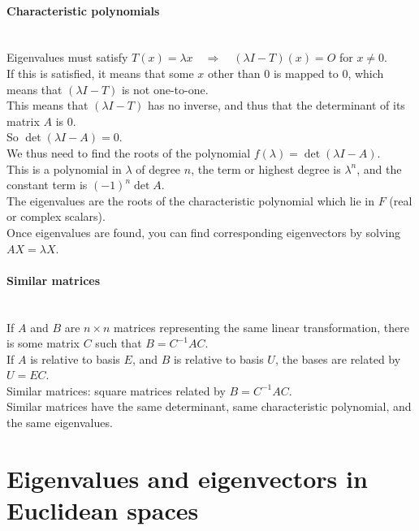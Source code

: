 \documentclass[10pt]{article}
\begin{document}
\paragraph{Characteristic polynomials}\ \\
Eigenvalues must satisfy $T(x) = \lambda x \quad \Longrightarrow \quad (\lambda I - T)(x) = O$ for $x \neq 0$.\\
If this is satisfied, it means that some $x$ other than $0$ is mapped to $0$, which means that $(\lambda I - T)$ is not one-to-one.\\
This means that $(\lambda I - T)$ has no inverse, and thus that the determinant of its matrix $A$ is $0$.\\
So $\det(\lambda I - A) = 0$.\\
We thus need to find the roots of the polynomial $f(\lambda) = \det(\lambda I - A)$.\\
This is a polynomial in $\lambda$ of degree $n$, the term or highest degree is $\lambda^n$, and the constant term is $(-1)^n \det A$.\\
The eigenvalues are the roots of the characteristic polynomial which lie in $F$ (real or complex scalars).\\
Once eigenvalues are found, you can find corresponding eigenvectors by solving $AX = \lambda X$.

\paragraph{Similar matrices}\ \\
If $A$ and $B$ are $n \times n$ matrices representing the same linear transformation, there is some matrix $C$
such that $B = C^{-1}AC$.\\
If $A$ is relative to basis $E$, and $B$ is relative to basis $U$, the bases are related by $U = EC$.\\
Similar matrices: square matrices related by $B = C^{-1}AC$.\\
Similar matrices have the same determinant, same characteristic polynomial, and the same eigenvalues.



\bigskip\bigskip
\section{Eigenvalues and eigenvectors in Euclidean spaces}\smallskip
\end{document}
